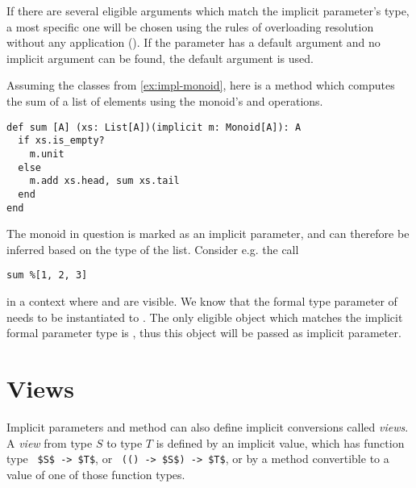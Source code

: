 If there are several eligible arguments which match the implicit parameter's type, a most specific one will be chosen using the rules of overloading resolution without any application (). If the parameter has a default argument and no implicit argument can be found, the default argument is used. 

\example Assuming the classes from \ref{ex:impl-monoid}, here is a method which computes the sum of a list of elements using the monoid's  and  operations.
\begin{lstlisting}
def sum [A] (xs: List[A])(implicit m: Monoid[A]): A 
  if xs.is_empty?
    m.unit
  else
    m.add xs.head, sum xs.tail
  end
end
\end{lstlisting}

The monoid in question is marked as an implicit parameter, and can therefore be inferred based on the type of the list. Consider e.g. the call
\begin{lstlisting}
sum %[1, 2, 3]
\end{lstlisting}
in a context where  and  are visible. We know that the formal type parameter  of  needs to be instantiated to . The only eligible object which matches the implicit formal parameter type  is , thus this object will be passed as implicit parameter. 






\section{Views}
\label{sec:views}

Implicit parameters and method can also define implicit conversions called {\em views}. A {\em view} from type $S$ to type $T$ is defined by an implicit value, which has function type ~\lstinline!$S$ -> $T$!, or ~\lstinline!(() -> $S$) -> $T$!, or by a method convertible to a value of one of those function types. 

